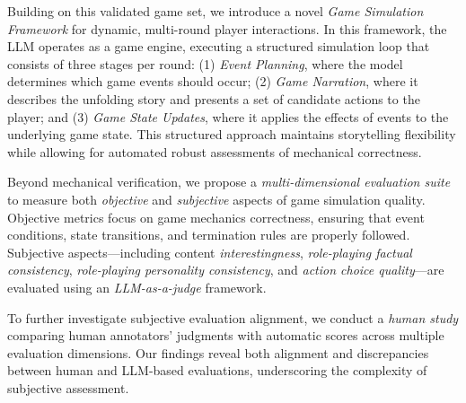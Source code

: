 Building on this validated game set, we introduce a novel \emph{Game Simulation Framework} for dynamic, multi-round player interactions. In this framework, the LLM operates as a game engine, executing a structured simulation loop that consists of three stages per round: (1) \emph{Event Planning}, where the model determines which game events should occur; (2) \emph{Game Narration}, where it describes the unfolding story and presents a set of candidate actions to the player; and (3) \emph{Game State Updates}, where it applies the effects of events to the underlying game state. This structured approach maintains storytelling flexibility while allowing for automated robust assessments of mechanical correctness.

Beyond mechanical verification, we propose a \emph{multi-dimensional evaluation suite} to measure both \emph{objective} and \emph{subjective} aspects of game simulation quality. Objective metrics focus on game mechanics correctness, ensuring that event conditions, state transitions, and termination rules are properly followed. Subjective aspects—including content \emph{interestingness}, \emph{role-playing factual consistency}, \emph{role-playing personality consistency}, and \emph{action choice quality}—are evaluated using an \emph{LLM-as-a-judge} framework. 

To further investigate subjective evaluation alignment, we conduct a \emph{human study} comparing human annotators’ judgments with automatic scores across multiple evaluation dimensions. Our findings reveal both alignment and discrepancies between human and LLM-based evaluations, underscoring the complexity of subjective assessment.

